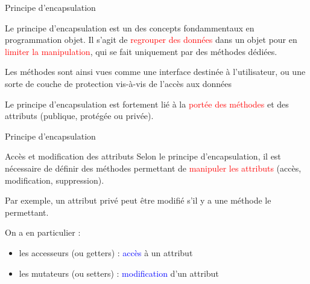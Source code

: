 \documentclass[10pt]{beamer}
\begin{document}
\begin{frame}[fragile]{Principe d'encapsulation}

  Le principe d'encapsulation est un des concepts fondammentaux en programmation objet. Il s'agit de \textcolor{red}{regrouper des données} dans un objet pour en \textcolor{red}{limiter la manipulation}, qui se fait uniquement par des méthodes dédiées.

  Les méthodes sont ainsi vues comme une interface destinée à l'utilisateur, ou une sorte de couche de protection vis-à-vis de l'accès aux données

  Le principe d'encapsulation est fortement lié à la \textcolor{red}{portée des méthodes} et des attributs (publique, protégée ou privée).

\end{frame}



\begin{frame}[fragile]{Principe d'encapsulation}

\begin{block}{Accès et modification des attributs}
\medskip
Selon le principe d'encapsulation, il est nécessaire de définir des méthodes permettant de \textcolor{red}{manipuler les attributs} (accès, modification, suppression).

Par exemple, un attribut privé peut être modifié s'il y a une méthode le permettant.

On a en particulier :
\begin{itemize}
  \item les accesseurs (ou getters) : \textcolor{blue}{accès} à un attribut
  \item les mutateurs (ou setters) : \textcolor{blue}{modification} d'un attribut
\end{itemize}
\end{block}

\end{frame}
\end{document}
